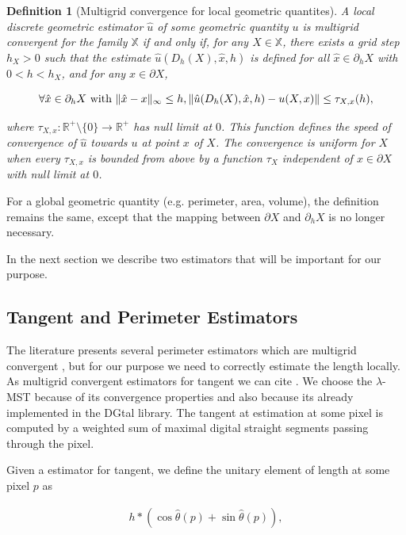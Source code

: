 \documentclass[runningheads]{llncs}
\newtheorem{ddef}{Definition}
\DeclarePairedDelimiter\norm{\lVert}{\rVert}%
\begin{document}
	\begin{ddef}[Multigrid convergence for local geometric quantites]
		A local discrete geometric estimator $\hat{u}$ of some geometric quantity $u$ is multigrid convergent for the family $\mathbb{X}$ if and only if, for any $X \in \mathbb{X}$, there exists a grid step $h_X>0$ such that the estimate $\hat{u}(D_h(X),\hat{x},h)$ is defined for all $\hat{x} \in \partial_hX$ with $ 0 < h < h_X$, and for any $x \in \partial X$,
		
		\begin{equation}
			\forall \hat{x} \in  \partial_hX \text{ with } \norm{ \hat{x} - x }_{\infty} \leq h, \norm{ \hat{u}(D_h(X),\hat{x},h) - u(X,x)} \leq \tau_{X,x}(h),			
		\end{equation}
		
		where $\tau_{X,x}:\mathbb{R}^{+}\setminus\{0\} \rightarrow \mathbb{R}^{+}$ has null limit at $0$. This function defines the speed of convergence of $\hat{u}$ towards $u$ at point $x$ of $X$. The convergence is uniform for $X$ when every $\tau_{X,x}$ is bounded from above by a function $\tau_X$ independent of $x \in \partial X$ with null limit at $0$.
	\end{ddef}
	
	
	For a global geometric quantity (e.g. perimeter, area, volume), the definition remains the same, except that the mapping between $\partial X$ and $\partial_h X$ is no longer necessary.
	
In the next section we describe two estimators that will be important for our purpose.

\subsection{Tangent and Perimeter Estimators}

The literature presents several perimeter estimators which are multigrid convergent \cite{}, but for our purpose we need to correctly estimate the length locally. As multigrid convergent estimators for tangent we can cite \cite{}. We choose the $\lambda$-MST because of its convergence properties and also because its already implemented in the DGtal library. The tangent at estimation at some pixel is computed by a weighted sum of maximal digital straight segments passing through the pixel.

 Given a estimator for tangent, we define the unitary element of length at some pixel $p$ as

\begin{align*}
	h*\left(\cos \hat{\theta}(p)  + \sin \hat{\theta}(p)\right),
\end{align*}
\end{document}
